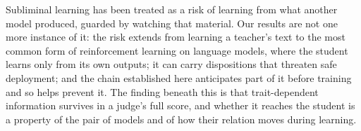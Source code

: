 Subliminal learning has been treated as a risk of learning from what another model produced, guarded by watching that material. Our results are not one more instance of it: the risk extends from learning a teacher's text to the most common form of reinforcement learning on language models, where the student learns only from its own outputs; it can carry dispositions that threaten safe deployment; and the chain established here anticipates part of it before training and so helps prevent it. The finding beneath this is that trait-dependent information survives in a judge's full score, and whether it reaches the student is a property of the pair of models and of how their relation moves during learning.
